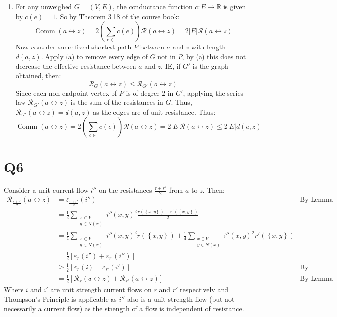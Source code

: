 \documentclass[a4paper, 11pt]{article}
\newcommand{\RR}{\mathbb{R}}
\def\set#1{\left\{ #1 \right\}}
\def\abs#1{\left|#1\right|}
\begin{document}
\begin{enumerate}[label=(\alph*)]
		\item For any unweighed $G=(V,E)$, the conductance function $c:E\to\RR$ is given by $c(e)=1$. So by Theorem 3.18 of the course book: 
		\[
			\operatorname{Comm}(a\leftrightarrow z) = 2 \left( \sum_{e\in} c(e)\right)	\mathcal{R}(a\leftrightarrow z) = 2\abs{E}\mathcal{R}(a\leftrightarrow z)
		\]
		Now consider some fixed shortest path $P$ between $a$ and $z$ with length $d(a,z)$. Apply (a) to remove every edge of $G$ not in $P$, by (a) this does not decrease the effective resistance between $a$ and $z$. IE, if $G'$ is the graph obtained, then:
		\[
			\mathcal{R}_{G}(a\leftrightarrow z)	
			\leq \mathcal{R}_{G'}(a\leftrightarrow z)
		\]
		Since each non-endpoint vertex of $P$ is of degree $2$ in $G'$, applying the series law $\mathcal{R}_{G'}(a\leftrightarrow z)$ is the sum of the resistances in $G$. Thus, $\mathcal{R}_{G'}(a\leftrightarrow z)=d(a,z)$ as the edges are of unit resistance. Thus: 
	\[
		\operatorname{Comm}(a\leftrightarrow z) = 2 \left( \sum_{e\in} c(e)\right)	\mathcal{R}(a\leftrightarrow z) = 2\abs{E}\mathcal{R}(a\leftrightarrow z) \leq 2\abs{E}d(a,z)	
	\]


\end{enumerate}

\section*{Q6}


Consider a unit current flow $i''$ on the resistances $\frac{r+r'}2$ from $a$ to $z$. Then:
\begin{align*}
	\mathcal{R}_{\frac{r+r'}2}(a\leftrightarrow z)
	 & = \varepsilon_{\frac{r+r'}2}(i'') &\text{By Lemma 3.29} \\
	 & = \frac 12 \sum_{\substack{x\in V\\ y\in N(x)}} i''(x,y)^2 \frac{r(\set{x,y})+r'(\set{x,y})}{2} \\
	 & = \frac 14 \sum_{\substack{x\in V\\ y\in N(x)}} i''(x,y)^2 r(\set{x,y})
	   + \frac 14 \sum_{\substack{x\in V\\ y\in N(x)}} i''(x,y)^2 r'(\set{x,y})\\
	 & = \frac12 \left[ \varepsilon_{r}(i'') + \varepsilon_{r'}(i'') \right]\\
	 & \geq \frac12 \left[ \varepsilon_{r}(i) + \varepsilon_{r'}(i') \right] &\text{By Thompson's Principle}\\
	 & = \frac12 \left[ 
	   \mathcal{R}_{r}(a\leftrightarrow z) 
	 + \mathcal{R}_{r'}(a\leftrightarrow z) 
	 \right]&\text{By Lemma 3.29}
\end{align*}
Where $i$ and $i'$ are unit strength current flows on $r$ and $r'$ respectively and Thompson's Principle is applicable as $i''$ also is a unit strength flow (but not necessarily a current flow) as the strength of a flow is independent of resistance. 
\end{document}
